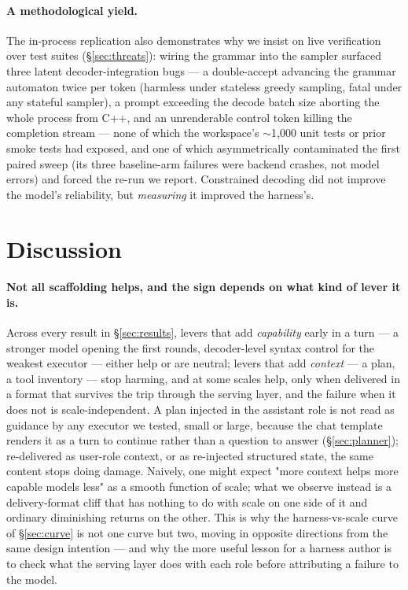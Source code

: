 \documentclass[smallcondensed,natbib]{svjour3}
\begin{document}
\paragraph{A methodological yield.} The in-process replication also
demonstrates why we insist on live verification over test suites
(\S\ref{sec:threats}): wiring the grammar into the sampler surfaced
three latent decoder-integration bugs --- a double-accept advancing the
grammar automaton twice per token (harmless under stateless greedy
sampling, fatal under any stateful sampler), a prompt exceeding the
decode batch size aborting the whole process from C++, and an
unrenderable control token killing the completion stream --- none of
which the workspace's $\sim$1{,}000 unit tests or prior smoke tests had
exposed, and one of which asymmetrically contaminated the first paired
sweep (its three baseline-arm failures were backend crashes, not model
errors) and forced the re-run we report. Constrained decoding did not
improve the model's reliability, but \emph{measuring} it improved the
harness's.

\section{Discussion}\label{sec:discussion}

\paragraph{Not all scaffolding helps, and the sign depends on what kind
of lever it is.} Across every result in \S\ref{sec:results}, levers
that add \emph{capability} early in a turn --- a stronger model opening
the first rounds, decoder-level syntax control for the weakest
executor --- either help or are neutral; levers that add \emph{context}
--- a plan, a tool inventory --- stop harming, and at some scales
help, only when delivered in a format that survives the trip through
the serving layer, and the failure when it does not is
scale-independent. A plan injected in the assistant role is not read
as guidance by any executor we tested, small or large, because the
chat template renders it as a turn to continue rather than a question
to answer (\S\ref{sec:planner}); re-delivered as user-role context, or
as re-injected structured state, the same content stops doing damage.
Naively, one might expect "more context helps more capable models
less" as a smooth function of scale; what we observe instead is a
delivery-format cliff that has nothing to do with scale on one side of
it and ordinary diminishing returns on the other. This is why the
harness-vs-scale curve of \S\ref{sec:curve} is not one curve but two,
moving in opposite directions from the same design intention --- and
why the more useful lesson for a harness author is to check what the
serving layer does with each role before attributing a failure to the
model.
\end{document}
